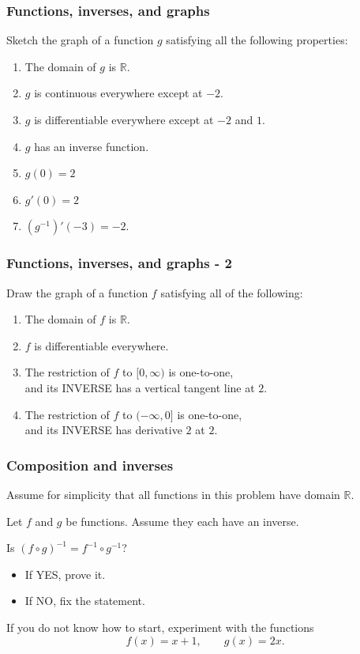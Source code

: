 \documentclass[14pt]{beamer}
\newcommand {\DS} [1] {${\displaystyle #1}$}
\newcommand {\R}{\mathbb{R}}
\newcommand{\p}{\pause}
\begin{document}
\begin{frame}[t]
\frametitle{Functions, inverses, and graphs }

Sketch the graph of a function $g$ satisfying all the following properties:

\begin{enumerate}
	\item  The domain of $g$ is $\R$.
	\item $g$ is continuous everywhere except at $-2$.
	\item $g$ is differentiable everywhere except at $-2$ and $1$.
	\item  $g$ has an inverse function.
	\item  $g(0)=2$
	\item $g'(0) = 2$
	\item \DS{\left(g^{-1}\right)' (-3) = -2}.
\end{enumerate}

\end{frame}

\begin{frame}[t]
\frametitle{Functions, inverses, and graphs - 2}

Draw the graph of a function $f$ satisfying all of the following:

	\begin{enumerate}
		\item The domain of $f$ is $\R$.
		\item $f$ is differentiable everywhere.
		\item The restriction of $f$ to \DS{[0, \infty)} is one-to-one,  \\ and its INVERSE has a vertical tangent line at $2$.
		\item The restriction of $f$ to \DS{(- \infty,0]} is one-to-one,  \\ and its INVERSE has derivative $2$ at $2$.
	\end{enumerate}

\end{frame}
\begin{frame}[t]
\frametitle{Composition and inverses}

Assume for simplicity that all functions in this problem have domain $\R$.

\vfill

Let $f$ and $g$ be functions.  Assume they each have an inverse.

\vfill

Is \DS{\left( f \circ g \right)^{-1} = f^{-1} \circ g^{-1}}?

\begin{itemize}
	\item If YES, prove it. 
	\item If NO, fix the statement.
\end{itemize}


\vfill  \p

If you do not know how to start, experiment with the functions
	$$
		f(x) = x + 1, \quad \quad g(x) = 2x.
	$$

\end{frame}
\end{document}

